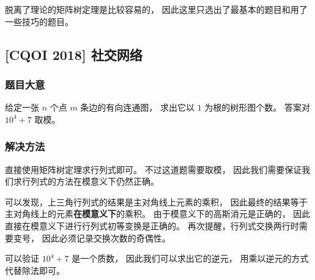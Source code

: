 \documentclass[UTF8]{article}
\begin{document}
	脱离了理论的矩阵树定理是比较容易的，
	因此这里只选出了最基本的题目和用了一些技巧的题目。

	\subsection{[CQOI 2018] 社交网络}

	\subsubsection{题目大意}

	给定一张 $n$ 个点 $m$ 条边的有向连通图，
	求出它以 $1$ 为根的树形图个数。
	答案对 $10^4 + 7$ 取模。

	\subsubsection{解决方法}

	直接使用矩阵树定理求行列式即可。
	不过这道题需要取模，
	因此我们需要保证我们求行列式的方法在模意义下仍然正确。

	可以发现，上三角行列式的结果是主对角线上元素的乘积，
	因此最终的结果等于主对角线上的元素\textbf{在模意义下}的乘积。
	由于模意义下的高斯消元是正确的，
	因此直接在模意义下进行行列式初等变换是正确的。
	再次提醒，行列式交换两行时需要变号，
	因此必须记录交换次数的奇偶性。

	可以验证 $10^4 + 7$ 是一个质数，
	因此我们可以求出它的逆元，
	用乘以逆元的方式代替除法即可。
\end{document}
